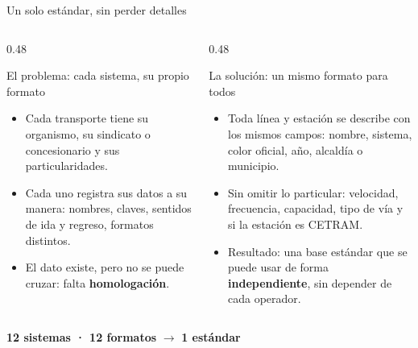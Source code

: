 \begin{frame}{Un solo estándar, sin perder detalles}
  \begin{columns}[T]
    \begin{column}{0.48\textwidth}
      \begin{alertblock}{\footnotesize El problema: cada sistema, su propio formato}
        \scriptsize
        \begin{itemize}\setlength{\itemsep}{0.05cm}
          \item Cada transporte tiene su organismo, su sindicato o concesionario
                y sus particularidades.
          \item Cada uno registra sus datos a su manera: nombres, claves,
                sentidos de ida y regreso, formatos distintos.
          \item El dato existe, pero no se puede cruzar: falta
                \textbf{homologación}.
        \end{itemize}
      \end{alertblock}
    \end{column}
    \begin{column}{0.48\textwidth}
      \begin{block}{\footnotesize La solución: un mismo formato para todos}
        \scriptsize
        \begin{itemize}\setlength{\itemsep}{0.05cm}
          \item Toda línea y estación se describe con los mismos campos:
                nombre, sistema, color oficial, año, alcaldía o municipio.
          \item Sin omitir lo particular: velocidad, frecuencia, capacidad,
                tipo de vía y si la estación es CETRAM.
          \item Resultado: una base estándar que se puede usar de forma
                \textbf{independiente}, sin depender de cada operador.
        \end{itemize}
      \end{block}
    \end{column}
  \end{columns}

  \vspace{0.4cm}
  \centering
  {\bfseries\color{SotmVerde} 12 sistemas · 12 formatos} \enspace
  {\color{SotmTerracota}\Large$\rightarrow$} \enspace
  {\bfseries\color{SotmTerracota} 1 estándar}
\end{frame}

